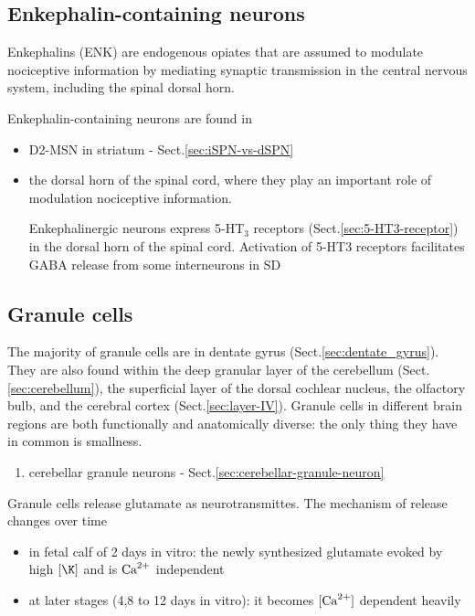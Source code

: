 \subsection{Enkephalin-containing neurons}
\label{sec:enkephalin-containing-neurons}
\label{sec:ENK-containing-neurons}

Enkephalins (ENK) are endogenous opiates that are assumed to modulate
nociceptive information by mediating synaptic transmission in the central
nervous system, including the spinal dorsal horn.

Enkephalin-containing neurons are found in
\begin{itemize}

  \item D2-MSN in striatum - Sect.\ref{sec:iSPN-vs-dSPN}
  
  
  \item the dorsal horn of the spinal cord, where they play an
important role of modulation nociceptive information.

Enkephalinergic neurons express 5-HT$_3$ receptors
(Sect.\ref{sec:5-HT3-receptor}) in the dorsal horn of the spinal cord.
Activation of 5-HT3 receptors facilitates GABA release from some interneurons in
SD
  
\end{itemize}

\subsection{Granule cells}
\label{sec:granule_cells}

The majority of granule cells are in dentate gyrus
(Sect.\ref{sec:dentate_gyrus}). They are also found within the deep granular
layer of the cerebellum (Sect.\ref{sec:cerebellum}), the superficial layer of
the dorsal cochlear nucleus, the olfactory bulb, and the cerebral cortex
(Sect.\ref{sec:layer-IV}).
Granule cells in different brain regions are both functionally and anatomically
diverse: the only thing they have in common is smallness.
\begin{enumerate}
  \item cerebellar granule neurons - Sect.\ref{sec:cerebellar-granule-neuron}
\end{enumerate}

Granule cells release glutamate as neurotransmittes. The mechanism of release
changes over time \citep{gallo1982}
\begin{itemize}
  \item in fetal calf of 2 days in vitro: the newly synthesized glutamate evoked
  by high $[\K]$ and is ${\text{Ca}^{2+}}$ independent
  
  \item at later stages (4,8 to 12 days in vitro): it becomes $[{\text{Ca}^{2+}}]$ dependent
  heavily
\end{itemize} 

